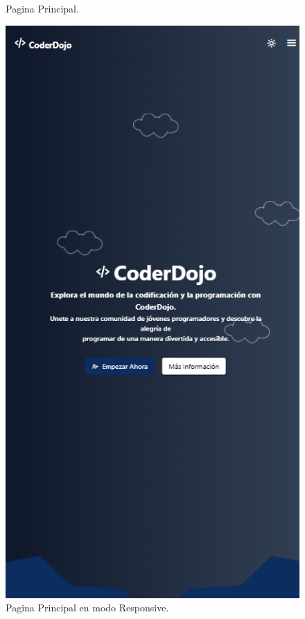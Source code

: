 \documentclass{article}
\begin{document}
\begin{figure}[H]
\begin{minipage}{0.45\textwidth}
		\caption{Pagina Principal.}
	\end{minipage}
	\hfill
	\begin{minipage}{0.45\textwidth}
		\centering
		\includegraphics[width=\textwidth,keepaspectratio]{img/homeResponsiveDark.png}
		\caption{Pagina Principal en modo Responsive.}
	\end{minipage}
	\vspace{1em}
\end{figure}
\end{document}
